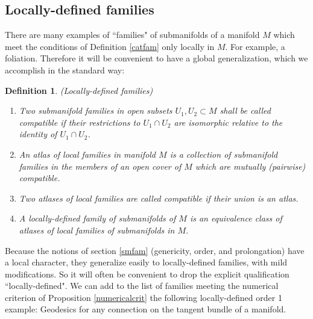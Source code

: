 \documentclass[12pt]{article}
\numberwithin{equation}{section}
\theoremstyle{plain}
\newtheorem{definition}{Definition}[section]
\theoremstyle{definition}
\newtheorem{remark}[definition]{Remark}
\begin{document}
\subsection{Locally-defined families}

There are many examples of ``families" of submanifolds of a manifold $M$ which meet the conditions of Definition \ref{catfam} only locally in $M$. For example, a foliation. Therefore it will be convenient to have a global generalization, which we accomplish in the standard way:
\begin{definition}\label{locallydefined}\emph{(Locally-defined families)}
\begin{enumerate}
\itemsep0em
\item{Two submanifold families in open subsets $U_1,U_2\subset M$ shall be called \emph{compatible} if their restrictions to $U_1\cap U_2$ are isomorphic relative to the identity of $U_1\cap U_2$.}
\item{An \emph{atlas of local families} in manifold $M$ is a collection of submanifold families in the members of an open cover of $M$ which are mutually (pairwise) compatible.}
\item{Two atlases of local families are called \emph{compatible} if their union is an atlas.}
\item{A \emph{locally-defined family} of submanifolds of $M$ is an equivalence class of atlases of local families of submanifolds in $M$.}
\end{enumerate}
\end{definition}


Because the notions of section \ref{smfam} (genericity, order, and prolongation) have a local character, they generalize easily to locally-defined families, with mild modifications. So it will often be convenient to drop the explicit qualification ``locally-defined". We can add to the list of families meeting the numerical criterion of Proposition \ref{numericalcrit} the following locally-defined order 1 example: Geodesics for any connection on the tangent bundle of a manifold.
\end{document}
